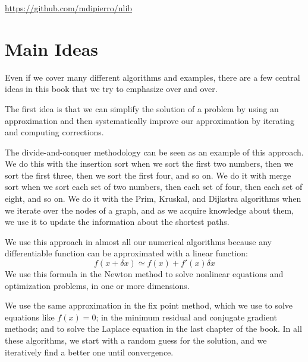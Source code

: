 \documentclass[justified, sixbynine]{tufte-book}
\theoremstyle{plain}%
\newtheorem * {corollary}{Corollary}
\theoremstyle{definition}
\theoremstyle{remark}
\newtheorem * {remark}{Remark}
\newtheorem * {note}{Note}
\begin{document}
\begin{fullwidth}
\url{https://github.com/mdipierro/nlib}

\section{Main Ideas}

Even if we cover many different algorithms and examples, there are a few central ideas in this book that we try to emphasize over and over.

The first idea is that we can simplify the solution of a problem by using an approximation and then systematically improve our approximation by iterating and computing corrections.

The divide-and-conquer methodology can be seen as an example of this approach. We do this with the insertion sort when we sort the first two numbers, then we sort the first three, then we sort the first four, and so on. We do it with merge sort when we sort each set of two numbers, then each set of four, then each set of eight, and so on. We do it with the Prim, Kruskal, and Dijkstra algorithms when we iterate over the nodes of a graph, and as we acquire knowledge about them, we use it to update the information about the shortest paths.

We use this approach in almost all our numerical algorithms because any differentiable function can be approximated with a linear function:
\begin{equation}
f(x+\delta x) \simeq f(x) + f'(x)\delta x
\end{equation}
We use this formula in the Newton method to solve nonlinear equations and optimization problems, in one or more dimensions.

We use the same approximation in the fix point method, which we use to solve equations like $f(x)=0$; in the minimum residual and conjugate gradient methods; and to solve the Laplace equation in the last chapter of the book. In all these algorithms, we start with a random guess for the solution, and we iteratively find a better one until convergence.


\end{fullwidth}
\end{document}
